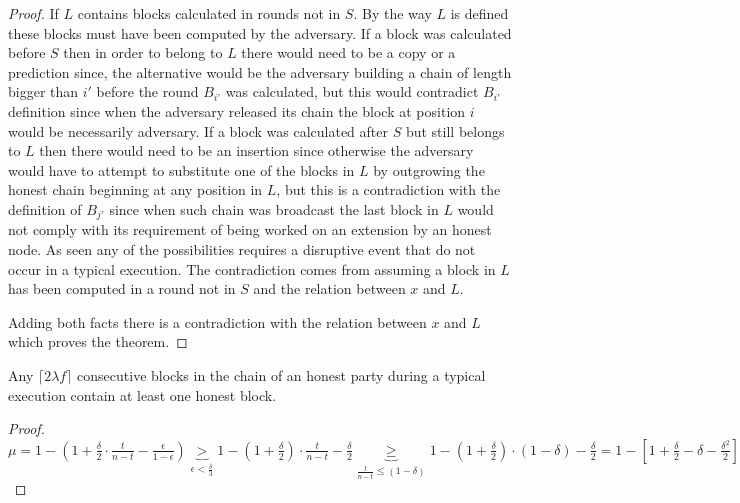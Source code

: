 \documentclass[..]{subfiles}
\begin{document}
\begin{proof}
	If $L$ contains blocks calculated in rounds not in $S$. By the way $L$ is defined these blocks must have been computed by the adversary. If a block was calculated before $S$ then in order to belong to $L$ there would need to be a copy or a prediction since, the alternative would be the adversary building a chain of length bigger than $i'$ before the round $B_{i'}$ was calculated, but this would contradict $B_{i'}$ definition since when the adversary released its chain the block at position $i$ would be necessarily adversary. If a block was calculated after $S$ but still belongs to $L$ then there would need to be an insertion since otherwise the adversary would have to attempt to substitute one of the blocks in $L$ by outgrowing the honest chain beginning at any position in $L$, but this is a contradiction with the definition of $B_{j'}$ since when such chain was broadcast the last block in $L$ would not comply with its requirement of being worked on an extension by an honest node. As seen any of the possibilities requires a disruptive event that do not occur in a typical execution. The contradiction comes from assuming a block in $L$ has been computed in a round not in $S$ and the relation between $x$ and $L$.

	Adding both facts there is a contradiction with the relation between $x$ and $L$ which proves the theorem.
\end{proof}


\begin{corollary}
	Any $\lceil 2 \lambda f \rceil$ consecutive blocks in the chain of an honest party during a typical execution contain at least one honest block.
\end{corollary}
\begin{proof}
	$\mu = 1 - (1 + \frac{\delta}{2} \cdot \frac{t}{n-t} - \frac{\epsilon}{1-\epsilon}) \underbrace{>}_\text{$\epsilon < \frac{\delta}{3}$} 1 - (1 + \frac{\delta}{2}) \cdot \frac{t}{n-t} - \frac{\delta}{2} \underbrace{\ge}_\text{$\frac{t}{n-t} \le (1-\delta)$} 1 - (1 + \frac{\delta}{2}) \cdot (1-\delta) - \frac{\delta}{2} = 1 - [1 + \frac{\delta}{2} - \delta - \frac{\delta^2}{2}] - \frac{\delta}{2} = \frac{\delta^2}{2} > 0$
\end{proof}
\end{document}
